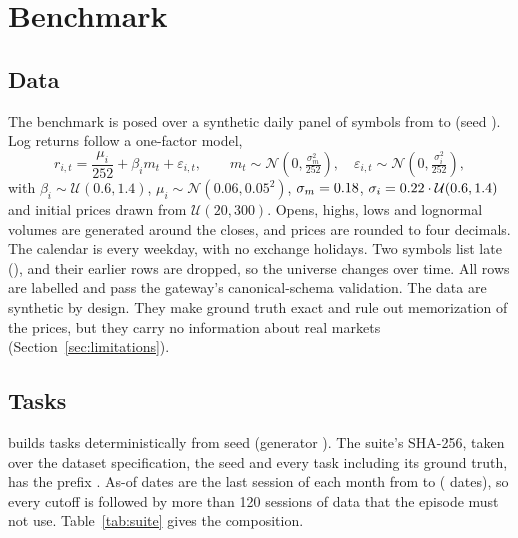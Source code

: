\section{Benchmark}
\label{sec:benchmark}

\subsection{Data}
\label{sec:data}

The benchmark is posed over a synthetic daily panel of \DataSymbols{} symbols
from \DataStart{} to \DataEnd{} (seed \DataSeed{}). Log returns follow a
one-factor model,
\begin{equation}
  r_{i,t} = \frac{\mu_i}{252} + \beta_i m_t + \varepsilon_{i,t}, \qquad
  m_t \sim \mathcal{N}\!\left(0, \tfrac{\sigma_m^2}{252}\right), \quad
  \varepsilon_{i,t} \sim \mathcal{N}\!\left(0, \tfrac{\sigma_i^2}{252}\right),
\end{equation}
with $\beta_i \sim \mathcal{U}(0.6, 1.4)$, $\mu_i \sim \mathcal{N}(0.06, 0.05^2)$,
$\sigma_m = 0.18$, $\sigma_i = 0.22 \cdot \mathcal{U}(0.6, 1.4)$
and initial prices drawn from $\mathcal{U}(20, 300)$. Opens, highs, lows and
lognormal volumes are generated around the closes, and prices are rounded to
four decimals. The calendar is every weekday, with no exchange holidays. Two
symbols list late (\DataListings{}), and their earlier rows are dropped, so the
universe changes over time. All rows are labelled 
and pass the gateway's canonical-schema validation. The data are synthetic by
design. They make ground truth exact and rule out memorization of the prices,
but they carry no information about real markets
(Section~\ref{sec:limitations}).

\subsection{Tasks}
\label{sec:tasks}

 builds \SuiteTasks{} tasks deterministically from seed
\SuiteSeed{} (generator \code{\SuiteGenerator}). The suite's SHA-256, taken
over the dataset specification, the seed and every task including its ground
truth, has the prefix \code{\SuiteShort}. As-of dates are the last session of
each month from \SuiteAsOfFirst{} to \SuiteAsOfLast{} (\SuiteAsOfDates{}
dates), so every cutoff is followed by more than 120 sessions of data that the
episode must not use. Table~\ref{tab:suite} gives the composition.

